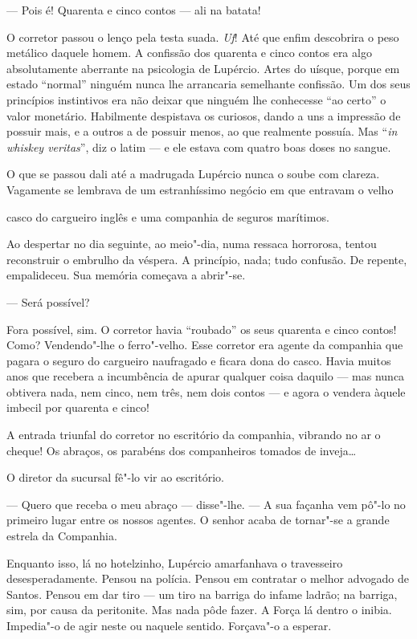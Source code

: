 --- Pois é! Quarenta e cinco contos --- ali na batata!

O corretor passou o lenço pela testa suada. \emph{Uf}! Até que enfim
descobrira o peso metálico daquele homem. A confissão dos quarenta e
cinco contos era algo absolutamente aberrante na psicologia de Lupércio.
Artes do uísque, porque em estado ``normal'' ninguém nunca lhe
arrancaria semelhante confissão. Um dos seus princípios instintivos era
não deixar que ninguém lhe conhecesse ``ao certo'' o valor monetário.
Habilmente despistava os curiosos, dando a uns a impressão de possuir
mais, e a outros a de possuir menos, ao que realmente possuía. Mas
``\emph{in whiskey veritas}'', diz o latim --- e ele estava com quatro
boas doses no sangue.

O que se passou dali até a madrugada Lupércio nunca o soube com clareza.
Vagamente se lembrava de um estranhíssimo negócio em que entravam o
velho

casco do cargueiro inglês e uma companhia de seguros marítimos.

Ao despertar no dia seguinte, ao meio"-dia, numa ressaca horrorosa,
tentou reconstruir o embrulho da véspera. A princípio, nada; tudo
confusão. De repente, empalideceu. Sua memória começava a abrir"-se.

--- Será possível?

Fora possível, sim. O corretor havia ``roubado'' os seus quarenta e
cinco contos! Como? Vendendo"-lhe o ferro"-velho. Esse corretor era agente
da companhia que pagara o seguro do cargueiro naufragado e ficara dona
do casco. Havia muitos anos que recebera a incumbência de apurar
qualquer coisa daquilo --- mas nunca obtivera nada, nem cinco, nem três,
nem dois contos --- e agora o vendera àquele imbecil por quarenta e
cinco!

A entrada triunfal do corretor no escritório da companhia, vibrando no
ar o cheque! Os abraços, os parabéns dos companheiros tomados de
inveja\ldots{}

O diretor da sucursal fê"-lo vir ao escritório.

--- Quero que receba o meu abraço --- disse"-lhe. --- A sua façanha vem
pô"-lo no primeiro lugar entre os nossos agentes. O senhor acaba de
tornar"-se a grande estrela da Companhia.

Enquanto isso, lá no hotelzinho, Lupércio amarfanhava o travesseiro
desesperadamente. Pensou na polícia. Pensou em contratar o melhor
advogado de Santos. Pensou em dar tiro --- um tiro na barriga do infame
ladrão; na barriga, sim, por causa da peritonite. Mas nada pôde fazer. A
Força lá dentro o inibia. Impedia"-o de agir neste ou naquele sentido.
Forçava"-o a esperar.

